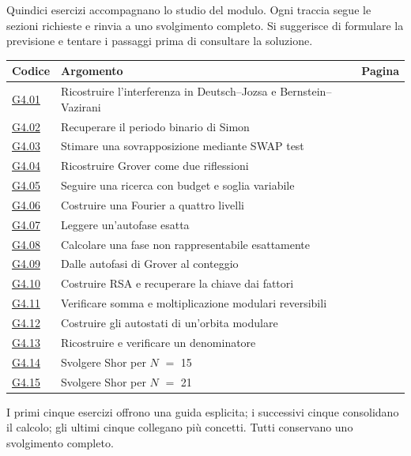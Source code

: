 \clearpage{}\label{exercise-index-4}
Quindici esercizi accompagnano lo studio del modulo. Ogni traccia segue le sezioni richieste e rinvia a uno svolgimento completo. Si suggerisce di formulare la previsione e tentare i passaggi prima di consultare la soluzione.
\begin{longtable}{@{}p{13mm}p{75mm}r@{}}\toprule Codice & Argomento & Pagina\\\midrule\endhead
\hyperref[ex-G4.01]{G4.01} & Ricostruire l'interferenza in Deutsch--Jozsa e Bernstein--Vazirani & \pageref{ex-G4.01}\\[3pt]
\hyperref[ex-G4.02]{G4.02} & Recuperare il periodo binario di Simon & \pageref{ex-G4.02}\\[3pt]
\hyperref[ex-G4.03]{G4.03} & Stimare una sovrapposizione mediante SWAP test & \pageref{ex-G4.03}\\[3pt]
\hyperref[ex-G4.04]{G4.04} & Ricostruire Grover come due riflessioni & \pageref{ex-G4.04}\\[3pt]
\hyperref[ex-G4.05]{G4.05} & Seguire una ricerca con budget e soglia variabile & \pageref{ex-G4.05}\\[3pt]
\hyperref[ex-G4.06]{G4.06} & Costruire una Fourier a quattro livelli & \pageref{ex-G4.06}\\[3pt]
\hyperref[ex-G4.07]{G4.07} & Leggere un'autofase esatta & \pageref{ex-G4.07}\\[3pt]
\hyperref[ex-G4.08]{G4.08} & Calcolare una fase non rappresentabile esattamente & \pageref{ex-G4.08}\\[3pt]
\hyperref[ex-G4.09]{G4.09} & Dalle autofasi di Grover al conteggio & \pageref{ex-G4.09}\\[3pt]
\hyperref[ex-G4.10]{G4.10} & Costruire RSA e recuperare la chiave dai fattori & \pageref{ex-G4.10}\\[3pt]
\hyperref[ex-G4.11]{G4.11} & Verificare somma e moltiplicazione modulari reversibili & \pageref{ex-G4.11}\\[3pt]
\hyperref[ex-G4.12]{G4.12} & Costruire gli autostati di un'orbita modulare & \pageref{ex-G4.12}\\[3pt]
\hyperref[ex-G4.13]{G4.13} & Ricostruire e verificare un denominatore & \pageref{ex-G4.13}\\[3pt]
\hyperref[ex-G4.14]{G4.14} & Svolgere Shor per \(N\) \(=\) 15 & \pageref{ex-G4.14}\\[3pt]
\hyperref[ex-G4.15]{G4.15} & Svolgere Shor per \(N\) \(=\) 21 & \pageref{ex-G4.15}\\[3pt]
\bottomrule\end{longtable}
{\small I primi cinque esercizi offrono una guida esplicita; i successivi cinque consolidano il calcolo; gli ultimi cinque collegano più concetti. Tutti conservano uno svolgimento completo.}\par
